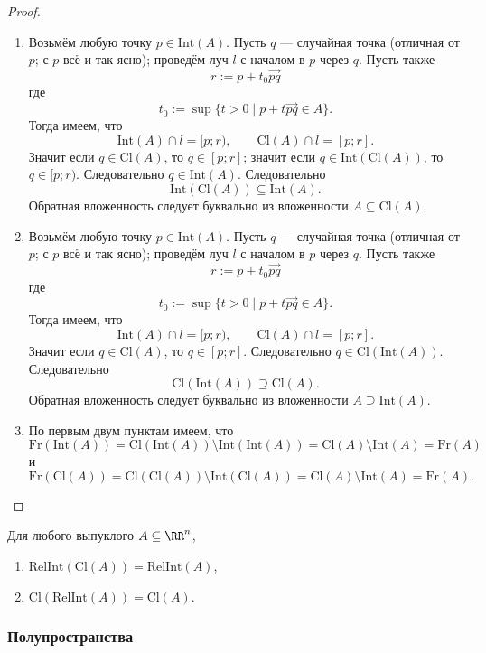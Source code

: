 \documentclass[12pt,a4paper]{article}
\newcommand{\Int}{\ensuremath{\mathrm{Int}}\xspace}
\newcommand{\Cl}{\ensuremath{\mathrm{Cl}}\xspace}
\newcommand{\Fr}{\ensuremath{\mathrm{Fr}}\xspace}
\newcommand{\RelInt}{\ensuremath{\mathrm{RelInt}}\xspace}
\begin{document}
    \begin{proof}
        \begin{enumerate}
            \item Возьмём любую точку $p \in \Int(A)$. Пусть $q$ --- случайная точка (отличная от $p$; с $p$ всё и так ясно); проведём луч $l$ с началом в $p$ через $q$. Пусть также
                \[r := p + t_0 \overrightarrow{pq}\]
                где
                \[t_0 := \sup \{t > 0 \mid p + t \overrightarrow{pq} \in A\}.\]
                Тогда имеем, что
                \[\Int(A) \cap l = [p;r), \qquad \Cl(A) \cap l = [p;r].\]
                Значит если $q \in \Cl(A)$, то $q \in [p; r]$; значит если $q \in \Int(\Cl(A))$, то $q \in [p; r)$. Следовательно $q \in \Int(A)$. Следовательно
                \[\Int(\Cl(A)) \subseteq \Int(A).\]
                Обратная вложенность следует буквально из вложенности $A \subseteq \Cl(A)$.
            \item Возьмём любую точку $p \in \Int(A)$. Пусть $q$ --- случайная точка (отличная от $p$; с $p$ всё и так ясно); проведём луч $l$ с началом в $p$ через $q$. Пусть также
                \[r := p + t_0 \overrightarrow{pq}\]
                где
                \[t_0 := \sup \{t > 0 \mid p + t \overrightarrow{pq} \in A\}.\]
                Тогда имеем, что
                \[\Int(A) \cap l = [p;r), \qquad \Cl(A) \cap l = [p;r].\]
                Значит если $q \in \Cl(A)$, то $q \in [p; r]$. Следовательно $q \in \Cl(\Int(A))$. Следовательно
                \[\Cl(\Int(A)) \supseteq \Cl(A).\]
                Обратная вложенность следует буквально из вложенности $A \supseteq \Int(A)$.
            \item По первым двум пунктам имеем, что
                \[\Fr(\Int(A)) = \Cl(\Int(A)) \setminus \Int(\Int(A)) = \Cl(A) \setminus \Int(A) = \Fr(A)\]
                и
                \[\Fr(\Cl(A)) = \Cl(\Cl(A)) \setminus \Int(\Cl(A)) = \Cl(A) \setminus \Int(A) = \Fr(A).\]
        \end{enumerate}
    \end{proof}

    \begin{corollary}
        Для любого выпуклого $A \subseteq \RR^n$,
        \begin{enumerate}
            \item $\RelInt(\Cl(A)) = \RelInt(A)$,
            \item $\Cl(\RelInt(A)) = \Cl(A)$.
        \end{enumerate}
    \end{corollary}

    \subsubsection{Полупространства}

    \begin{definition}
        
    \end{definition}
\end{document}
